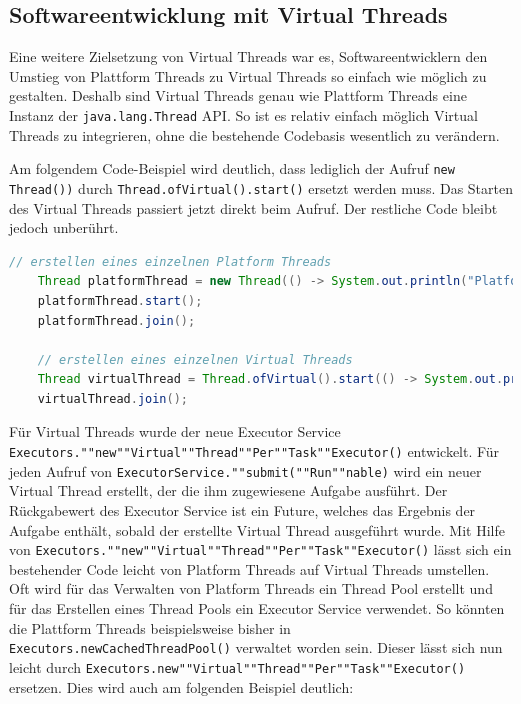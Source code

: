 \documentclass[fontsize=12pt,paper=a4,twoside=semi,parskip=half-,headsepline,headinclude]{scrreprt}
\newcommand{\code}[1]{\texttt{#1}}
\begin{document}
\subsection{Softwareentwicklung mit Virtual Threads}

Eine weitere Zielsetzung von Virtual Threads war es, Softwareentwicklern den Umstieg von Plattform Threads zu Virtual Threads so einfach wie möglich zu gestalten. Deshalb sind Virtual Threads genau wie Plattform Threads eine Instanz der \code{java.lang.Thread} API. So ist es relativ einfach möglich Virtual Threads zu integrieren, ohne die bestehende Codebasis wesentlich zu verändern.

Am folgendem Code-Beispiel wird deutlich, dass lediglich der Aufruf \code{new Thread())} durch \code{Thread.ofVirtual().start()} ersetzt werden muss. Das Starten des Virtual Threads passiert jetzt direkt beim Aufruf. Der restliche Code bleibt jedoch unberührt.

\begin{lstlisting}[language=Java]
	// erstellen eines einzelnen Platform Threads	
	Thread platformThread = new Thread(() -> System.out.println("Platform Thread"));
	platformThread.start();
	platformThread.join();

	// erstellen eines einzelnen Virtual Threads
	Thread virtualThread = Thread.ofVirtual().start(() -> System.out.println("Virtual Thread"));
	virtualThread.join();
\end{lstlisting}

Für Virtual Threads wurde der neue Executor Service \code{Executors.""new""Virtual""Thread""Per""Task""Executor()} entwickelt. Für jeden Aufruf von \texttt{ExecutorService.""submit(""Run""nable)} wird ein neuer Virtual Thread erstellt, der die ihm zugewiesene Aufgabe ausführt. Der Rückgabewert des Executor Service ist ein Future, welches das Ergebnis der Aufgabe enthält, sobald der erstellte Virtual Thread ausgeführt wurde. Mit Hilfe von \code{Executors.""new""Virtual""Thread""Per""Task""Executor()} lässt sich ein bestehender Code leicht von Platform Threads auf Virtual Threads umstellen. Oft wird für das Verwalten von Platform Threads ein Thread Pool erstellt und für das Erstellen eines Thread Pools ein Executor Service verwendet. So könnten die Plattform Threads beispielsweise bisher in \code{Executors.newCachedThreadPool()} verwaltet worden sein. Dieser lässt sich nun leicht durch \code{Executors.new""Virtual""Thread""Per""Task""Executor()} ersetzen. Dies wird auch am folgenden Beispiel deutlich:
\end{document}
